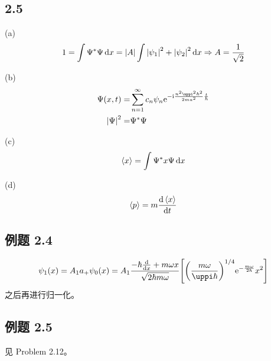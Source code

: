 \subsection{2.5}
\begin{framed}
    (a)
    \[
        1 = \int \Psi^* \Psi \dd{x} = \qty|A| \int \qty|\psi_1|^2 + \qty|\psi_2|^2 \dd{x} \Rightarrow A = \frac{1}{\sqrt{2}}
    \]

    (b)
    \begin{align*}
        \Psi(x, t) =   & \sum_{n = 1}^{\infty} c_n \psi_n \rme^{- \rmi \frac{n^2 \uppi^2 \hbar^2}{2 m a^2} \frac{t}{\hbar}} \\
        \qty|\Psi|^2 = & \Psi^* \Psi
    \end{align*}

    (c)
    \[
        \expval{x} = \int \Psi^* x \Psi \dd{x}
    \]

    (d)
    \[
        \expval{p} = m \dv{\expval{x}}{t}
    \]
\end{framed}

\subsection{例题 2.4}
\begin{framed}
    \[
        \psi_1(x) = A_1 a_+ \psi_0(x) = A_1 \frac{- \hbar \dv{x} + m \omega x}{\sqrt{2 \hbar m \omega}} \qty[\qty(\frac{m \omega}{\uppi \hbar})^{1 / 4} \rme^{- \frac{m \omega}{2 \hbar}} x^2]
    \] 之后再进行归一化。
\end{framed}

\subsection{例题 2.5}
\begin{framed}
    见 Problem 2.12。
\end{framed}

